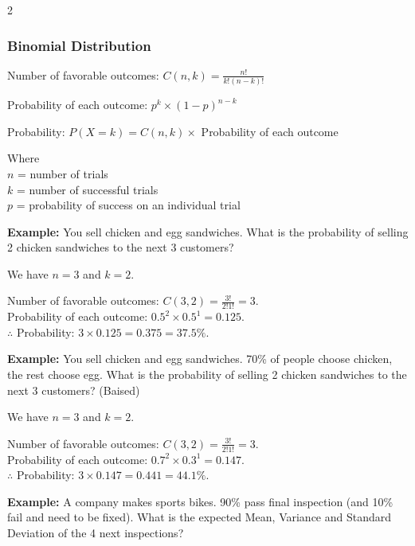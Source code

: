 \vspace*{-\baselineskip}

\begin{multicols}{2}
\subsubsection{Binomial Distribution}
Number of favorable outcomes: $C(n, k) = \frac{n!}{k!(n-k)!}$

Probability of each outcome: $p^k \times (1-p)^{n-k}$

Probability: $P(X=k) = C(n, k) \times$ Probability of each outcome

Where\\
$n$ = number of trials \\
$k$ = number of successful trials \\
$p$ = probability of success on an individual trial

\vfill\null

\columnbreak
\textbf{Example:} You sell chicken and egg sandwiches. What is the probability of selling 2 chicken sandwiches to the next 3 customers?

We have $n=3$ and $k=2$.

Number of favorable outcomes: $C(3, 2) = \frac{3!}{2!1!} = 3$.\\[0.75em]
Probability of each outcome: $0.5^2 \times 0.5^1 = 0.125$.\\[0.75em]
$\therefore$ Probability: $3 \times 0.125 = 0.375 = 37.5\%$.

\vspace{1em}

\textbf{Example:} You sell chicken and egg sandwiches. 70\% of people choose chicken, the rest choose egg. What is the probability of selling 2 chicken sandwiches to the next 3 customers? (Baised)

We have $n=3$ and $k=2$.

Number of favorable outcomes: $C(3, 2) = \frac{3!}{2!1!} = 3$.\\[0.75em]
Probability of each outcome: $0.7^2 \times 0.3^1 = 0.147$.\\[0.75em]
$\therefore$ Probability: $3 \times 0.147 = 0.441 = 44.1\%$.

\vspace{1em}

\textbf{Example:} A company makes sports bikes. 90\% pass final inspection (and 10\% fail and need to be fixed). What is the expected Mean, Variance and Standard Deviation of the 4 next inspections?


\end{multicols}
